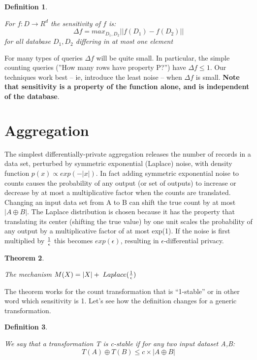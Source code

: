 \documentclass{article}
\newtheorem{thm}{Theorem}[section]
\newtheorem{defn}[thm]{Definition}
\newenvironment{theorem}{\begin{thm}\begin{rm}}%
{\end{rm}\end{thm}}
\newenvironment{definition}{\begin{defn}\begin{em}}%
{\end{em}\end{defn}}
\begin{document}
\begin{definition}
For $f: D \rightarrow R^d$ the sensitivity of $f$ is:
\begin{equation}
\Delta f = max_{D_1,D_2}||f(D_1) - f(D_2)||
\end{equation}
for all database $D_1,D_2$ differing in at most one element
\end{definition}

For many types of queries $\Delta f$ will be quite small. In particular, the simple counting
queries (''How many rows have property P?'') have $\Delta f \leq 1$. Our techniques
work best – ie, introduce the least noise – when $\Delta f$ is small. \textbf{Note that sensitivity
is a property of the function alone, and is independent of the database}.\\



\section{Aggregation}
The simplest differentially-private aggregation 
releases the number of records in a data set, perturbed by
symmetric exponential (Laplace) noise, with density function
$p(x) \propto exp(−|x|)$. In fact adding symmetric exponential noise to
counts causes the probability of any output (or set
of outputs) to increase or decrease by at most a multiplicative
factor when the counts are translated.
Changing an input data set from A to B can shift the
true count by at most $|A \oplus B|$. The Laplace distribution is
chosen because it has the property that translating its center
(shifting the true value) by one unit scales the probability
of any output by a multiplicative factor of at most exp(1).
If the noise is first multiplied by $1 \over \epsilon$ this becomes $exp(\epsilon)$,
resulting in $\epsilon$-differential privacy.

\begin{theorem}
The mechanism $M(X) = |X| + \; Laplace({1 \over \epsilon})$
\end{theorem}

The theorem works for the count transformation that is ``1-stable'' or in other word which sensitivity is 1.
Let's see how the definition changes for a generic transformation. 
\begin{definition}
We say that a transformation T is c-stable if for any two input dataset A,B:
\begin{equation}
T(A) \oplus T(B) \leq c \times |A \oplus B|
\end{equation}
\end{definition}
\end{document}
